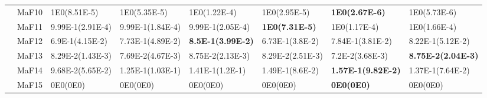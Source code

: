 \documentclass[]{article}
\begin{document}
\begin{landscape}
\begin{table}
\begin{footnotesize}
\begin{tabular}{|l|l|l|l|l|l|l|l|}
 & MaF10 & 1E0(8.51E-5) & 1E0(5.35E-5) & 1E0(1.22E-4) & 1E0(2.95E-5) & \cellcolor{gray95} {\bf 1E0(2.67E-6)} & \cellcolor{gray95} 1E0(5.73E-6)\\
 & MaF11 & 9.99E-1(2.91E-4) & 9.99E-1(1.84E-4) & 9.99E-1(2.05E-4) & \cellcolor{gray95} {\bf 1E0(7.31E-5)} & \cellcolor{gray95} 1E0(1.17E-4) & 1E0(1.66E-4)\\
 & MaF12 & 6.9E-1(4.15E-2) & 7.73E-1(4.89E-2) & \cellcolor{gray95} {\bf 8.5E-1(3.99E-2)} & 6.73E-1(3.8E-2) & 7.84E-1(3.81E-2) & \cellcolor{gray95} 8.22E-1(5.12E-2)\\
 & MaF13 & 8.29E-2(1.43E-3) & 7.69E-2(4.67E-3) & \cellcolor{gray95} 8.75E-2(2.13E-3) & 8.29E-2(2.51E-3) & 7.2E-2(3.68E-3) & \cellcolor{gray95} {\bf 8.75E-2(2.04E-3)}\\
 & MaF14 & \cellcolor{gray95} 9.68E-2(5.65E-2) & \cellcolor{gray95} 1.25E-1(1.03E-1) & \cellcolor{gray95} 1.41E-1(1.2E-1) & \cellcolor{gray95} 1.49E-1(8.6E-2) & \cellcolor{gray95} {\bf 1.57E-1(9.82E-2)} & \cellcolor{gray95} 1.37E-1(7.64E-2)\\
 & MaF15 & \cellcolor{gray95} 0E0(0E0) & \cellcolor{gray95} 0E0(0E0) & \cellcolor{gray95} 0E0(0E0) & \cellcolor{gray95} 0E0(0E0) & \cellcolor{gray95} {\bf 0E0(0E0)} & \cellcolor{gray95} 0E0(0E0)\\
\hline
\end{tabular}
\end{footnotesize}
\end{table}
\end{landscape}
\end{document}
